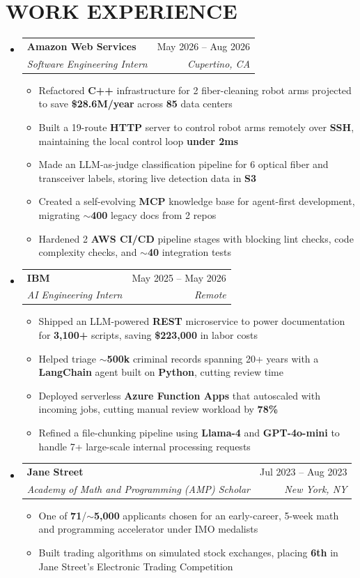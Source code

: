\documentclass[letterpaper,11pt]{article}
\makeatletter
\newcommand{\resumeItem}[1]{
  \item\small{
    {#1 \vspace{-4pt}}
  }
}
\newcommand{\resumeSubheading}[4]{
  \item
    \begin{tabular*}{0.97\textwidth}[t]{l@{\extracolsep{\fill}}r}
      \textbf{#1} & #2 \\
      \textit{\small#3} & \textit{\small #4} \\
    \end{tabular*}\vspace{-7pt}
}
\newcommand{\resumeSubHeadingListStart}{\begin{itemize}[leftmargin=0.15in, label={}]}
\newcommand{\resumeSubHeadingListEnd}{\end{itemize}}
\newcommand{\resumeItemListStart}{\begin{itemize}[itemsep=4.5pt]}
\newcommand{\resumeItemListEnd}{\end{itemize}\vspace{-6pt}}
\makeatother
\begin{document}
\section{\textbf{WORK EXPERIENCE}}
  \resumeSubHeadingListStart
  \resumeSubheading
      {Amazon Web Services}{May 2026 -- Aug 2026}
      {Software Engineering Intern}{Cupertino, CA}
      \resumeItemListStart
        \resumeItem{Refactored \textbf{C++} infrastructure for 2 fiber-cleaning robot arms projected to save \textbf{\$28.6M/year} across \textbf{85} data centers}
        \resumeItem{Built a 19-route \textbf{HTTP} server to control robot arms remotely over \textbf{SSH}, maintaining the local control loop \textbf{under 2ms}}
        \resumeItem{Made an LLM-as-judge classification pipeline for 6 optical fiber and transceiver labels, storing live detection data in \textbf{S3}}
        \resumeItem{Created a self-evolving \textbf{MCP} knowledge base for agent-first development, migrating \textbf{$\sim$400} legacy docs from 2 repos}
        \resumeItem{Hardened 2 \textbf{AWS CI/CD} pipeline stages with blocking lint checks, code complexity checks, and \textbf{$\sim$40} integration tests}
      \resumeItemListEnd
    \resumeSubheading
      {IBM}{May 2025 -- May 2026}
      {AI Engineering Intern}{Remote}
      \resumeItemListStart
        \resumeItem{Shipped an LLM-powered \textbf{REST} microservice to power documentation for \textbf{3,100+} scripts, saving \textbf{\$223,000} in labor costs}
        \resumeItem{Helped triage \textbf{$\sim$500k} criminal records spanning 20+ years with a \textbf{LangChain} agent built on \textbf{Python}, cutting review time}
        \resumeItem{Deployed serverless \textbf{Azure Function Apps} that autoscaled with incoming jobs, cutting manual review workload by \textbf{78\%}}
        \resumeItem{Refined a file-chunking pipeline using \textbf{Llama-4} and \textbf{GPT-4o-mini} to handle 7+ large-scale internal processing requests}
      \resumeItemListEnd
    \resumeSubheading
      {Jane Street}{Jul 2023 -- Aug 2023}
      {Academy of Math and Programming (AMP) Scholar}{New York, NY}
      \resumeItemListStart
        \resumeItem{One of \textbf{71}/$\sim$\textbf{5,000} applicants chosen for an early-career, 5-week math and programming accelerator under IMO medalists}
        \resumeItem{Built trading algorithms on simulated stock exchanges, placing \textbf{6th} in Jane Street's Electronic Trading Competition}
      \resumeItemListEnd
  \resumeSubHeadingListEnd

\end{document}
